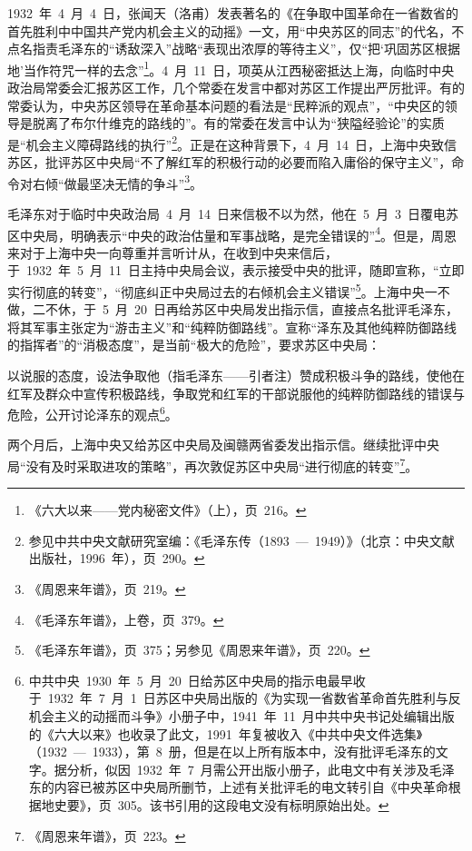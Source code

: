 1932~年~4~月~4~日，张闻天（洛甫）发表著名的《在争取中国革命在一省数省的首先胜利中中国共产党内机会主义的动摇》一文，用“中央苏区的同志”的代名，不点名指责毛泽东的“诱敌深入”战略“表现出浓厚的等待主义”，仅“把‘巩固苏区根据地’当作符咒一样的去念”\footnote{《六大以来——党内秘密文件》（上），页~216。}。4~月~11~日，项英从江西秘密抵达上海，向临时中央政治局常委会汇报苏区工作，几个常委在发言中都对苏区工作提出严厉批评。有的常委认为，中央苏区领导在革命基本问题的看法是“民粹派的观点”，“中央区的领导是脱离了布尔什维克的路线的”。有的常委在发言中认为“狭隘经验论”的实质是“机会主义障碍路线的执行”\footnote{参见中共中央文献研究室编：《毛泽东传（1893~—~1949）》（北京：中央文献出版社，1996~年），页~290。}。正是在这种背景下，4~月~14~日，上海中央致信苏区，批评苏区中央局“不了解红军的积极行动的必要而陷入庸俗的保守主义”，命令对右倾“做最坚决无情的争斗”\footnote{《周恩来年谱》，页~219。}。

毛泽东对于临时中央政治局~4~月~14~日来信极不以为然，他在~5~月~3~日覆电苏区中央局，明确表示“中央的政治估量和军事战略，是完全错误的”\footnote{《毛泽东年谱》，上卷，页~379。}。但是，周恩来对于上海中央一向尊重并言听计从，在收到中央来信后，于~1932~年~5~月~11~日主持中央局会议，表示接受中央的批评，随即宣称，“立即实行彻底的转变”，“彻底纠正中央局过去的右倾机会主义错误”\footnote{《毛泽东年谱》，页~375；另参见《周恩来年谱》，页~220。}。上海中央一不做，二不休，于~5~月~20~日再给苏区中央局发出指示信，直接点名批评毛泽东，将其军事主张定为“游击主义”和“纯粹防御路线”。宣称“泽东及其他纯粹防御路线的指挥者”的“消极态度”，是当前“极大的危险”，要求苏区中央局：

\begin{quoting}
以说服的态度，设法争取他（指毛泽东——引者注）赞成积极斗争的路线，使他在红军及群众中宣传积极路线，争取党和红军的干部说服他的纯粹防御路线的错误与危险，公开讨论泽东的观点\footnote{中共中央~1930~年~5~月~20~日给苏区中央局的指示电最早收于~1932~年~7~月~1~日苏区中央局出版的《为实现一省数省革命首先胜利与反机会主义的动摇而斗争》小册子中，1941~年~11~月中共中央书记处编辑出版的《六大以来》也收录了此文，1991~年复被收入《中共中央文件选集》（1932~—~1933），第~8~册，但是在以上所有版本中，没有批评毛泽东的文字。据分析，似因~1932~年~7~月需公开出版小册子，此电文中有关涉及毛泽东的内容已被苏区中央局所删节，上述有关批评毛的电文转引自《中央革命根据地史要》，页~305。该书引用的这段电文没有标明原始出处。}。
\end{quoting}

两个月后，上海中央又给苏区中央局及闽赣两省委发出指示信。继续批评中央局“没有及时采取进攻的策略”，再次敦促苏区中央局“进行彻底的转变”\footnote{《周恩来年谱》，页~223。}。

